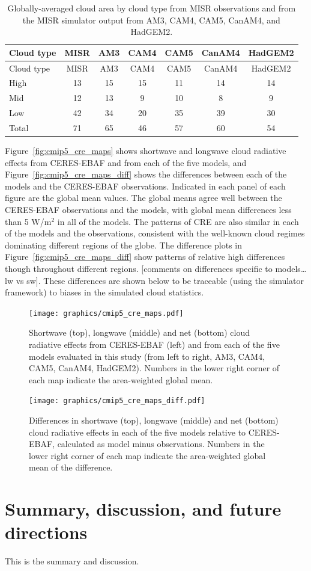 \begin{longtable}[]{@{}lcccccc@{}}
\caption{\label{tbl:cmip5_cldmisr}Globally-averaged cloud area by cloud
type from MISR observations and from the MISR simulator output from AM3,
CAM4, CAM5, CanAM4, and HadGEM2. }\tabularnewline
\toprule
Cloud type & MISR & AM3 & CAM4 & CAM5 & CanAM4 & HadGEM2\tabularnewline
\midrule
\endfirsthead
\toprule
Cloud type & MISR & AM3 & CAM4 & CAM5 & CanAM4 & HadGEM2\tabularnewline
\midrule
\endhead
High & 13 & 15 & 15 & 11 & 14 & 14\tabularnewline
Mid & 12 & 13 & 9 & 10 & 8 & 9\tabularnewline
Low & 42 & 34 & 20 & 35 & 39 & 30\tabularnewline
Total & 71 & 65 & 46 & 57 & 60 & 54\tabularnewline
\bottomrule
\end{longtable}

Figure~\ref{fig:cmip5_cre_maps} shows shortwave and longwave cloud
radiative effects from CERES-EBAF and from each of the five models, and
Figure~\ref{fig:cmip5_cre_maps_diff} shows the differences between each
of the models and the CERES-EBAF observations. Indicated in each panel
of each figure are the global mean values. The global means agree well
between the CERES-EBAF observations and the models, with global mean
differences less than 5 W/m\(^2\) in all of the models. The patterns of
CRE are also similar in each of the models and the observations,
consistent with the well-known cloud regimes dominating different
regions of the globe. The difference plots in
Figure~\ref{fig:cmip5_cre_maps_diff} show patterns of relative high
differences though throughout different regions. {[}comments on
differences specific to models\ldots{}lw vs sw{]}. These differences are
shown below to be traceable (using the simulator framework) to biases in
the simulated cloud statistics.

\begin{figure}[htbp]
\centering
\texttt{[image: graphics/cmip5\_cre\_maps.pdf]}
\caption{\label{fig:cmip5_cre_maps}Shortwave (top), longwave (middle)
and net (bottom) cloud radiative effects from CERES-EBAF (left) and from
each of the five models evaluated in this study (from left to right,
AM3, CAM4, CAM5, CanAM4, HadGEM2). Numbers in the lower right corner of
each map indicate the area-weighted global
mean.}\label{fig:cmip5ux5fcreux5fmaps}
\end{figure}

\begin{figure}[htbp]
\centering
\texttt{[image: graphics/cmip5\_cre\_maps\_diff.pdf]}
\caption{\label{fig:cmip5_cre_maps_diff}Differences in shortwave (top),
longwave (middle) and net (bottom) cloud radiative effects in each of
the five models relative to CERES-EBAF, calculated as model minus
observations. Numbers in the lower right corner of each map indicate the
area-weighted global mean of the
difference.}\label{fig:cmip5ux5fcreux5fmapsux5fdiff}
\end{figure}

\section{Summary, discussion, and future
directions}\label{summary-discussion-and-future-directions}

This is the summary and discussion.
